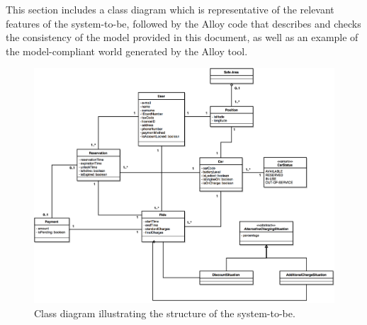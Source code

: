 This section includes a class diagram which is representative of the relevant features of the system-to-be, followed by the Alloy code that describes and checks the consistency of the model provided in this document, as well as an example of the model-compliant world generated by the Alloy tool.

\begin{figure}[H]
\begin{center}
		\includegraphics[width=\textwidth]{./pictures/class_diagram.png}
		\caption{Class diagram illustrating the structure of the system-to-be.}
		\label{class_diagram}
\end{center}
\end{figure}

\newpage



